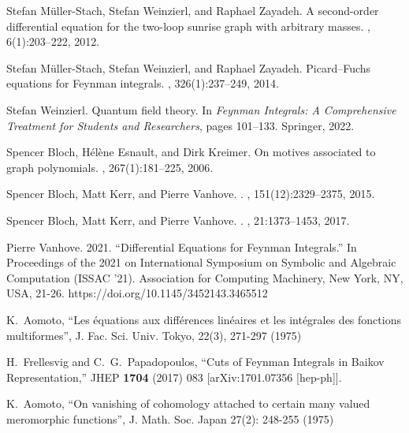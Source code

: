 \documentclass[a4paper,12pt]{article}
\numberwithin{equation}{section}
\numberwithin{figure}{section}
\begin{document}
\begin{thebibliography}{99}
Stefan M{\"u}ller-Stach, Stefan Weinzierl, and Raphael Zayadeh.
\newblock A second-order differential equation for the two-loop sunrise graph
  with arbitrary masses.
, 6(1):203--222,
2012.
\newblock [arXiv:1112.4360]

Stefan M{\"u}ller-Stach, Stefan Weinzierl, and Raphael Zayadeh.
\newblock Picard--{F}uchs equations for {F}eynman integrals.
,
326(1):237--249, 2014.
\newblock [arXiv:1212.4389]

Stefan Weinzierl.
\newblock Quantum field theory.
\newblock In {\em Feynman Integrals: A Comprehensive Treatment for Students and
  Researchers}, pages 101--133. Springer, 2022.
\newblock [arXiv:2201.03593] 


Spencer Bloch, H{\'e}l{\`e}ne Esnault, and Dirk Kreimer.
\newblock On motives associated to graph polynomials.
,
267(1):181--225, 2006.

Spencer Bloch, Matt Kerr, and Pierre Vanhove.
.
, 151(12):2329--2375, 2015.
\newblock [arXiv:1406.2664] 

Spencer Bloch, Matt Kerr, and Pierre Vanhove.
.
, 21:1373--1453, 2017.
\newblock [arXiv:1601.08181]
  
  Pierre Vanhove. 2021. ``Differential Equations for Feynman Integrals.'' In Proceedings of the 2021 on International Symposium on Symbolic and Algebraic Computation (ISSAC '21). Association for Computing Machinery, New York, NY, USA, 21-26. https://doi.org/10.1145/3452143.3465512

    K.~Aomoto, ``Les \'equations aux diff\'erences
     lin\'eaires et les int\'egrales des fonctions multiformes'',
     J. Fac. Sci. Univ. Tokyo, 22(3), 271-297  (1975)
  
  H.~Frellesvig and C.~G.~Papadopoulos,
  ``Cuts of Feynman Integrals in Baikov Representation,''
  JHEP {\bf 1704} (2017) 083
  [arXiv:1701.07356 [hep-ph]].

   K.~Aomoto, ``On vanishing of cohomology attached to
    certain many valued meromorphic functions'', J. Math. Soc. Japan
    27(2): 248-255 (1975)


\end{thebibliography}
\end{document}
